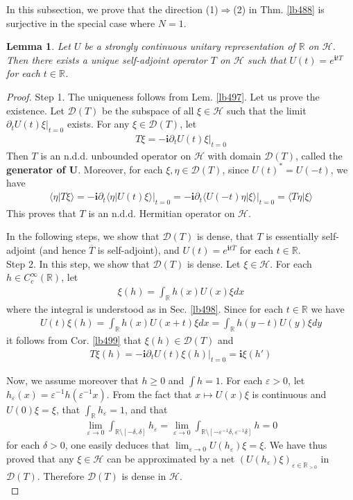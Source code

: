 \documentclass[12pt,b5paper,notitlepage]{article}
\theoremstyle{definition}
\theoremstyle{plain}
\newtheorem{lm}[df]{Lemma}
\newcommand{\ovl}{\overline}
\newcommand{\Dom}{\mathscr{D}}
\newcommand{\bk}[1]{\langle {#1}\rangle}
\newcommand{\im}{\mathbf{i}}
\newcommand{\Rbb}{\mathbb R}
\newcommand{\eps}{\varepsilon}
\newcommand{\MH}{\mathcal H}
\numberwithin{equation}{section}
\begin{document}
In this subsection, we prove that the direction (1)$\Rightarrow$(2) in Thm. \ref{lb488} is surjective in the special case where $N=1$.



\begin{lm}\label{lb502}
Let $U$ be a strongly continuous unitary representation of $\Rbb$ on $\MH$. Then there exists a unique self-adjoint operator $T$ on $\MH$ such that $U(t)=e^{\im tT}$ for each $t\in\Rbb$.
\end{lm}


\begin{proof}
Step 1. The uniqueness follows from Lem. \ref{lb497}. Let us prove the existence. Let $\Dom(T)$ be the subspace of all $\xi\in\MH$ such that the limit $\partial_t U(t)\xi|_{t=0}$ exists. For any $\xi\in\Dom(T)$, let
\begin{align*}
T\xi=-\im\partial_t U(t)\xi\big|_{t=0}
\end{align*}
Then $T$ is an n.d.d. unbounded operator on $\MH$ with domain $\Dom(T)$, called the \textbf{generator of $\pmb U$}. Moreover, for each $\xi,\eta\in\Dom(T)$, since $U(t)^*=U(-t)$, we have
\begin{align*}
\bk{\eta|T\xi}=-\im\partial_t\bk{\eta| U(t)\xi}\big|_{t=0}=-\im\partial_t\bk{U(-t)\eta|\xi}\big|_{t=0}=\bk{T\eta|\xi}
\end{align*}
This proves that $T$ is an n.d.d. Hermitian operator on $\MH$.

In the following steps, we show that $\Dom(T)$ is dense, that $T$ is essentially self-adjoint (and hence $\ovl T$ is self-adjoint), and $U(t)=e^{\im t\ovl T}$ for each $t\in\Rbb$.\\[-1ex]

Step 2. In this step, we show that $\Dom(T)$ is dense. Let $\xi\in\MH$. For each $h\in C_c^\infty(\Rbb)$, let
\begin{align*}
\xi(h)=\int_\Rbb h(x)U(x)\xi dx
\end{align*}
where the integral is understood as in Sec. \ref{lb498}. Since for each $t\in\Rbb$ we have
\begin{align*}
U(t)\xi(h)=\int_\Rbb h(x)U(x+t)\xi dx=\int_\Rbb h(y-t)U(y)\xi dy
\end{align*}
it follows from Cor. \ref{lb499} that $\xi(h)\in\Dom(T)$ and
\begin{align*}
T\xi(h)=-\im\partial_t U(t)\xi(h)\big|_{t=0}=\im \xi(h')
\end{align*}


Now, we assume moreover that $h\geq0$ and $\int h=1$. For each $\eps>0$, let $h_\eps(x)=\eps^{-1}h(\eps^{-1} x)$. From the fact that $x\mapsto U(x)\xi$ is continuous and $U(0)\xi=\xi$, that $\int_\Rbb h_\eps=1$, and that
\begin{align*}
\lim_{\eps\rightarrow0}\int_{\Rbb\setminus[-\delta,\delta]}h_\eps=\lim_{\eps\rightarrow0}\int_{\Rbb\setminus[-\eps^{-1}\delta,\eps^{-1}\delta]}h=0
\end{align*}
for each $\delta>0$, one easily deduces that $\lim_{\eps\rightarrow0}U(h_\eps)\xi=\xi$. We have thus proved that any $\xi\in\MH$ can be approximated by a net $(U(h_\eps)\xi)_{\eps\in\Rbb_{>0}}$ in $\Dom(T)$. Therefore $\Dom(T)$ is dense in $\MH$.\\[-1ex]


\end{proof}
\end{document}
